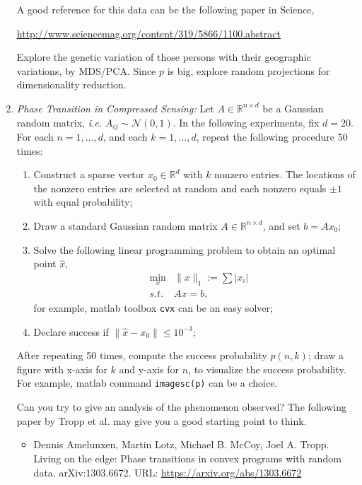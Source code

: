\documentclass[11pt]{article}
\def\NN{{\mathcal N}}
\def\R{{\mathbb R}}
\begin{document}
\begin{enumerate}
A good reference for this data can be the following paper in Science, 

\url{http://www.sciencemag.org/content/319/5866/1100.abstract}

Explore the genetic variation of those persons with their geographic variations, by MDS/PCA. Since $p$ is big, explore random projections for dimensionality reduction.  

\item {\em Phase Transition in Compressed Sensing:} Let $A\in \R^{n\times d}$ be a Gaussian random matrix, \emph{i.e.} $A_{ij} \sim \NN(0,1)$. In the following experiments, fix $d=20$. For each $n=1,\ldots,d$, and each $k=1,\ldots, d$, repeat the following procedure 50 times:

\begin{enumerate}
\item Construct a sparse vector $x_0\in\R^d$ with $k$ nonzero entries. The locations of the nonzero entries are selected at random and each nonzero equals $\pm 1$ with equal probability;
\item Draw a standard Gaussian random matrix $A\in \R^{n\times d}$, and set $b=Ax_0$;
\item Solve the following linear programming problem to obtain an optimal point $\hat{x}$,
\begin{eqnarray*}
&\min_x&  \|x\|_1:= \sum |x_i| \\
& s.t. & A x = b,
\end{eqnarray*} 
for example, matlab toolbox {\tt{cvx}} can be an easy solver;
\item Declare success if $\|\hat{x} - x_0\|\leq 10^{-3}$;
\end{enumerate}

After repeating 50 times, compute the success probability $p(n,k)$; draw a figure with x-axis for $k$ and y-axis for $n$, to visualize the success probability. For example, matlab command {\tt{imagesc(p)}} can be a choice. 

Can you try to give an analysis of the phenomenon observed? The following paper by Tropp et al. may give you a good starting point to think.

\begin{itemize}
\item Dennis Amelunxen, Martin Lotz, Michael B. McCoy, Joel A. Tropp. Living on the edge: Phase transitions in convex programs with random data. arXiv:1303.6672. URL: \url{https://arxiv.org/abs/1303.6672} 
\end{itemize}



\end{enumerate}
\end{document}
